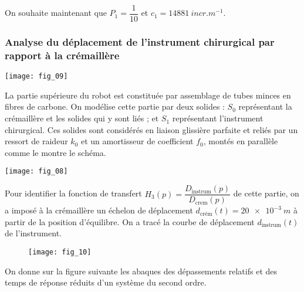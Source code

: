 \ifprof
\begin{corrige}
On souhaite maintenant que $P_1=\dfrac{1}{10}$ et $c_1 = \SI{148 81}{incr.m^{-1}}$.
\end{corrige}
\else
\fi

\subsubsection*{Analyse du déplacement de l’instrument chirurgical par rapport à la crémaillère}
\ifprof
\else

\begin{marginfigure}
\texttt{[image: fig\_09]}
\end{marginfigure}

La partie supérieure du robot est constituée par assemblage de tubes minces en fibres de carbone. 
On modélise cette partie par deux solides : $S_0$ représentant la crémaillère et les solides qui y sont liés ;  et $S_1$ représentant l’instrument chirurgical. 
Ces solides sont considérés en liaison glissière parfaite et reliés par un ressort de raideur $k_0$ et un amortisseur de coefficient $f_0$, montés en parallèle comme le montre le schéma.

\begin{marginfigure}
\texttt{[image: fig\_08]}
\end{marginfigure}

Pour identifier la fonction de transfert $H_3(p)=\dfrac{D_{\text{instrum}}(p)}{D_{\text{crem}}(p)}$ de cette partie, on a imposé à la crémaillère un échelon de déplacement $d_{\text{crém}}(t) = \SI{20e-3}{m}$ à partir de la position d’équilibre. On a tracé la courbe de déplacement $d_{\text{instrum}}(t)$ de l’instrument.


\begin{figure}[!h]
\texttt{[image: fig\_10]}
\end{figure}

On donne sur la figure suivante les abaques des dépassements relatifs et des temps de réponse réduits d’un système du second ordre.



\fi

